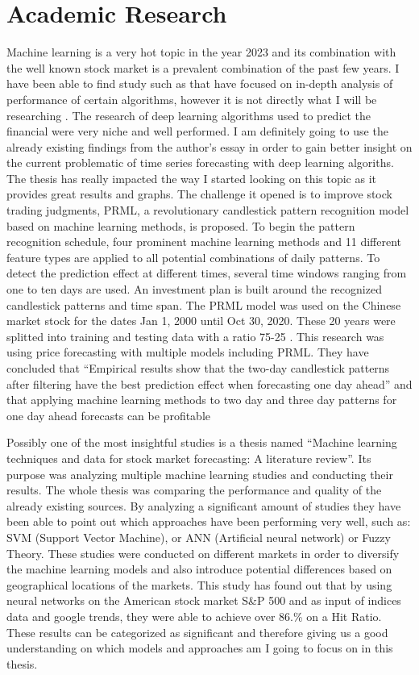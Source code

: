 \documentclass{imc-inf}
\begin{document}
	\section{Academic Research}
		Machine learning is a very hot topic in the year 2023 and its combination with the well known stock market is a prevalent combination
		of the past few years. I have been able to find study such as \cite{ref1}  that have focused on in-depth analysis of performance of certain algorithms,
		however it is not directly what I will be researching . The research of deep learning algorithms used to predict the financial \cite{deep_learning}
		were very niche and well performed. I am definitely going to use the already existing findings from the author's essay in order to gain better insight
		on the current problematic of time series forecasting with deep  learning algoriths. 
		The thesis \cite{prml} has really impacted the way I started looking on this topic as it provides great results and graphs.
		The challenge it opened is to improve stock trading judgments, PRML, a revolutionary candlestick pattern recognition model based on machine learning
		methods, is proposed. To begin the pattern recognition schedule, four prominent machine learning methods and 11 different feature types are applied 
		to all potential combinations of daily patterns. To detect the prediction effect at different times, several time windows ranging from one to ten days
		are used. An investment plan is built around the recognized candlestick patterns and time span.
		The PRML model was used on the Chinese market stock for the dates  Jan 1, 2000 until Oct 30, 2020. These 20 years were splitted into training
		and testing data with a ratio 75-25 . This research was using price forecasting with multiple models including PRML. They have concluded that 
		“Empirical results show that the two-day candlestick patterns after filtering have the best prediction effect when forecasting one day ahead”
		and that applying machine learning methods to two day and three day  patterns for one day ahead forecasts can be profitable

		Possibly one of the most insightful studies is a thesis named “Machine learning techniques and data for stock market forecasting: A literature review”. \cite{lit_review} 
		Its purpose was analyzing multiple machine learning studies and conducting their results. The whole thesis was comparing the performance and quality 
		of the already existing sources. By analyzing a significant amount of studies they have been able to point out which approaches have been performing
		very well, such as: SVM (Support Vector Machine), or  ANN (Artificial neural network) \cite{Deep_learning_2} or Fuzzy Theory. These studies were conducted on different markets
		in order to diversify the machine learning models and also introduce potential differences based on geographical locations of the markets.
		This study has found out that by using neural networks on the American stock market  S\&P 500  and as input of indices data and google trends,
		they were able to achieve over 86.\% on a Hit Ratio. These results can be categorized as significant and therefore giving us a good understanding 
		on which models and approaches am I going to focus on in this thesis.
\end{document}
